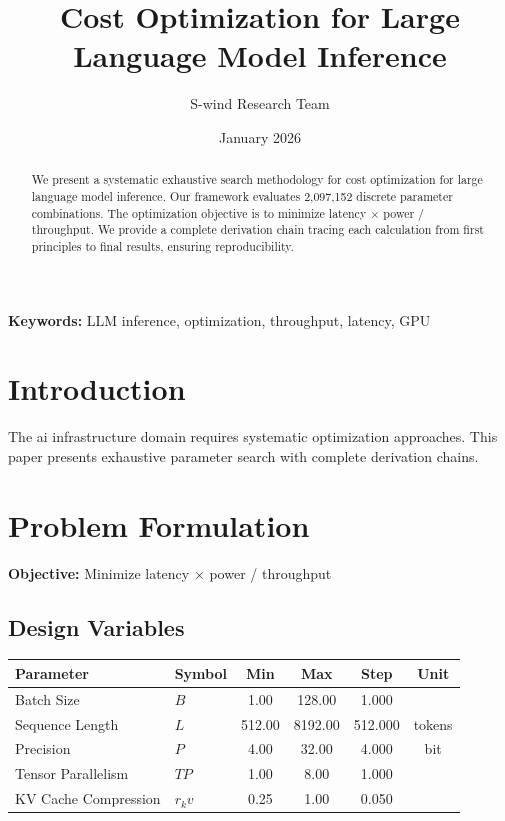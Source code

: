 \documentclass[11pt,a4paper]{article}
\title{Cost Optimization for Large Language Model Inference}
\author{S-wind Research Team}
\date{January 2026}
\begin{document}
\maketitle

\begin{abstract}
We present a systematic exhaustive search methodology for cost optimization for large language model inference. Our framework evaluates 2,097,152 discrete parameter combinations. The optimization objective is to minimize latency × power / throughput. We provide a complete derivation chain tracing each calculation from first principles to final results, ensuring reproducibility.
\end{abstract}

\textbf{Keywords:} LLM inference, optimization, throughput, latency, GPU

\section{Introduction}

The ai infrastructure domain requires systematic optimization approaches. This paper presents exhaustive parameter search with complete derivation chains.

\section{Problem Formulation}

\textbf{Objective:} Minimize latency × power / throughput

\subsection{Design Variables}

\begin{center}
\begin{tabular}{llcccc}
\hline
Parameter & Symbol & Min & Max & Step & Unit \\
\hline
Batch Size & $B$ & 1.00 & 128.00 & 1.000 &  \\
Sequence Length & $L$ & 512.00 & 8192.00 & 512.000 & tokens \\
Precision & $P$ & 4.00 & 32.00 & 4.000 & bit \\
Tensor Parallelism & $TP$ & 1.00 & 8.00 & 1.000 &  \\
KV Cache Compression & $r_kv$ & 0.25 & 1.00 & 0.050 &  \\
\hline
\end{tabular}
\end{center}
\end{document}
